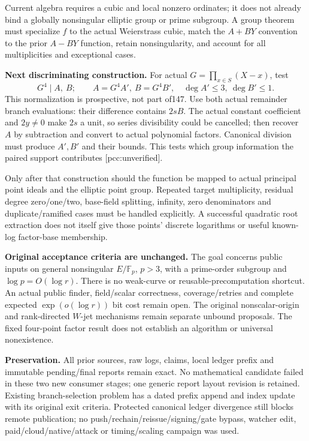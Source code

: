 \documentclass[10pt]{article}
\begin{document}
Current algebra requires a cubic and local nonzero ordinates; it does
not already bind a globally nonsingular elliptic group or prime subgroup.
A group theorem must specialize $f$ to the actual Weierstrass cubic,
match the $A+BY$ convention to the prior $A-BY$ function, retain
nonsingularity, and account for all multiplicities and exceptional cases.

\textbf{Next discriminating construction.}
For actual $G=\prod_{x\in S}(X-x)$, test
\[
 G^4\mid A,\ B;\qquad
 A=G^4A',\ B=G^4B',\quad
 \deg A'\le3,\ \deg B'\le1.
\]
This normalization is prospective, not part of147.
Use both actual remainder branch evaluations: their difference contains
$2sB$. The actual constant coefficient and $2y\ne0$ make $2s$ a unit,
so series divisibility could be cancelled; then recover $A$ by subtraction
and convert to actual polynomial factors.
Canonical division must produce $A',B'$ and their bounds.
This tests which group information the paired support contributes
[pcc:unverified].

Only after that construction should the function be mapped to actual
principal point ideals and the elliptic point group. Repeated target
multiplicity, residual degree zero/one/two, base-field splitting,
infinity, zero denominators and duplicate/ramified cases must be
handled explicitly. A successful quadratic root extraction does not
itself give those points' discrete logarithms or useful known-log
factor-base membership.

\textbf{Original acceptance criteria are unchanged.}
The goal concerns public inputs on general nonsingular $E/\mathbb F_p$,
$p>3$, with a prime-order subgroup and $\log p=O(\log r)$.
There is no weak-curve or reusable-precomputation shortcut.
An actual public finder, field/scalar correctness, coverage/retries and
complete expected $\exp(o(\log r))$ bit cost remain open.
The original nonscalar-origin and rank-directed $W$-jet mechanisms
remain separate unbound proposals. The fixed four-point factor result
does not establish an algorithm or universal nonexistence.

\textbf{Preservation.}
All prior sources, raw logs, claims, local ledger prefix and immutable
pending/final reports remain exact. No mathematical candidate failed
in these two new consumer stages; one generic report layout revision
is retained. Existing branch-selection problem has a dated prefix
append and index update with its original exit criteria.
Protected canonical ledger divergence still blocks remote publication;
no push/rechain/reissue/signing/gate bypass, watcher edit,
paid/cloud/native/attack or timing/scaling campaign was used.
\end{document}
